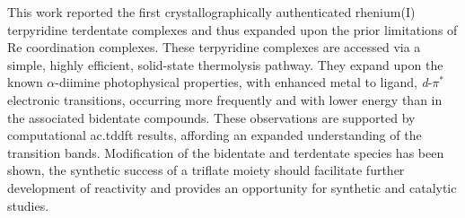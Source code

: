 This work reported the first crystallographically authenticated rhenium(I) terpyridine terdentate complexes and thus expanded upon the prior limitations of Re coordination complexes. These terpyridine complexes are accessed via a simple, highly efficient, solid-state thermolysis pathway. They expand upon the known $\alpha$-diimine photophysical properties, with enhanced metal to ligand, \textit{d}-$\pi^\ast$ electronic transitions, occurring more frequently and with lower energy than in the associated bidentate compounds. These observations are supported by computational \gls{ac.tddft} results, affording an expanded understanding of the transition bands. Modification of the bidentate and terdentate species has been shown, the synthetic success of a triflate moiety should facilitate further development of reactivity and provides an opportunity for synthetic and catalytic studies.



